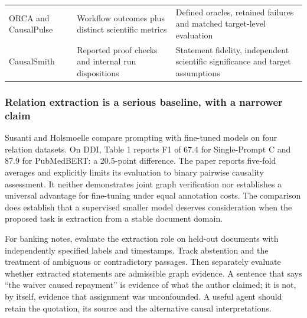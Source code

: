 \begin{longtable}[]{@{}lll@{}}
\begin{minipage}[t]{0.30\columnwidth}
ORCA and CausalPulse\strut
\end{minipage} & \begin{minipage}[t]{0.30\columnwidth}\raggedright
Workflow outcomes plus distinct scientific metrics\strut
\end{minipage} & \begin{minipage}[t]{0.30\columnwidth}\raggedright
Defined oracles, retained failures and matched target-level
evaluation\strut
\end{minipage}\tabularnewline
\begin{minipage}[t]{0.30\columnwidth}\raggedright
CausalSmith\strut
\end{minipage} & \begin{minipage}[t]{0.30\columnwidth}\raggedright
Reported proof checks and internal run dispositions\strut
\end{minipage} & \begin{minipage}[t]{0.30\columnwidth}\raggedright
Statement fidelity, independent scientific significance and target
assumptions\strut
\end{minipage}\tabularnewline
\bottomrule
\end{longtable}

\hypertarget{relation-extraction-is-a-serious-baseline-with-a-narrower-claim}{%
\subsubsection{Relation extraction is a serious baseline, with a
narrower
claim}\label{relation-extraction-is-a-serious-baseline-with-a-narrower-claim}}

Susanti and Holsmoelle compare prompting with fine-tuned models on four
relation datasets. On DDI, Table 1 reports F1 of 67.4 for Single-Prompt
C and 87.9 for PubMedBERT: a 20.5-point difference. The paper reports
five-fold averages and explicitly limits its evaluation to binary
pairwise causality assessment. It neither demonstrates joint graph
verification nor establishes a universal advantage for fine-tuning under
equal annotation costs. The comparison does establish that a supervised
smaller model deserves consideration when the proposed task is
extraction from a stable document domain.
\citep{exec13_census_graph_validation}

For banking notes, evaluate the extraction role on held-out documents
with independently specified labels and timestamps. Track abstention and
the treatment of ambiguous or contradictory passages. Then separately
evaluate whether extracted statements are admissible graph evidence. A
sentence that says ``the waiver caused repayment'' is evidence of what
the author claimed; it is not, by itself, evidence that assignment was
unconfounded. A useful agent should retain the quotation, its source and
the alternative causal interpretations.

